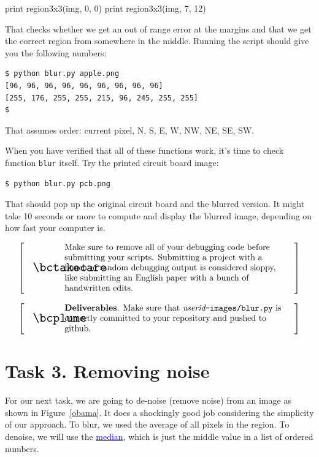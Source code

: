 \documentclass[titlepage]{tufte-book}
\makeatletter
\newcommand{\figref}[1]{Figure~\ref{#1}}
\newenvironment{callout}[1]{
\[
  \left[
      \begin{tabular}{@{\quad}m{.05\textwidth}@{\qquad}m{.75\textwidth}@{\quad}}
        \scalebox{1.5}{#1} & 
          \raggedright%
}
{
      \end{tabular}
    \right]
\]
}
\makeatother
\begin{document}
\begin{pyverbatim}
print region3x3(img, 0, 0)
print region3x3(img, 7, 12)
\end{pyverbatim}

\noindent That checks whether we get an out of range error at the margins and that we get the correct region from somewhere in the middle. Running the script should give you the following numbers:

\begin{lstlisting}[style=BashInputStyle]
$ python blur.py apple.png
[96, 96, 96, 96, 96, 96, 96, 96, 96]
[255, 176, 255, 255, 215, 96, 245, 255, 255]
$ 
\end{lstlisting}

\noindent That assumes order: current pixel, N, S, E, W, NW, NE, SE, SW.

When you have verified that all of these functions work, it's time to check function {\tt blur} itself. Try the printed circuit board image:

\begin{lstlisting}[style=BashInputStyle]
$ python blur.py pcb.png 
\end{lstlisting}

\noindent That should pop up the original circuit board and the blurred version. It might take 10 seconds or more to compute and display the blurred image, depending on how fast your computer is.

\begin{callout}{\bctakecare}
Make sure to remove all of your debugging code before submitting your scripts. Submitting a project with a bunch of random debugging output is considered sloppy, like submitting an English paper with a bunch of handwritten edits.
\end{callout}

\begin{callout}{\bcplume}
{\bf Deliverables}. Make sure that {\em userid}{\tt -images/blur.py} is correctly committed to your repository and pushed to github.
\end{callout}

\section{Task 3. Removing noise}

For our next task, we are going to de-noise (remove noise) from an image as shown in \figref{obama}. It does a shockingly good job considering the simplicity of our approach. To blur, we used the average of all pixels in the region. To denoise, we will use the \href{http://en.wikipedia.org/wiki/Median}{\textcolor{blue}{median}}, which is just the middle value in a list of ordered numbers.
\end{document}
